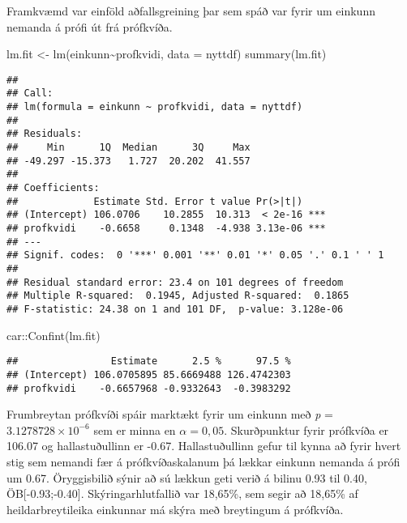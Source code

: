 \documentclass[
]{article}
\newenvironment{Shaded}{\begin{snugshade}}{\end{snugshade}}
\newcommand{\AttributeTok}[1]{\textcolor[rgb]{0.77,0.63,0.00}{#1}}
\newcommand{\FunctionTok}[1]{\textcolor[rgb]{0.00,0.00,0.00}{#1}}
\newcommand{\NormalTok}[1]{#1}
\newcommand{\OtherTok}[1]{\textcolor[rgb]{0.56,0.35,0.01}{#1}}
\newcommand{\SpecialCharTok}[1]{\textcolor[rgb]{0.00,0.00,0.00}{#1}}
\begin{document}
Framkvæmd var einföld aðfallsgreining þar sem spáð var fyrir um einkunn
nemanda á prófi út frá prófkvíða.

\begin{Shaded}
\begin{Highlighting}[]
\NormalTok{lm.fit }\OtherTok{\textless{}{-}} \FunctionTok{lm}\NormalTok{(einkunn}\SpecialCharTok{\textasciitilde{}}\NormalTok{profkvidi, }\AttributeTok{data =}\NormalTok{ nyttdf)}
\FunctionTok{summary}\NormalTok{(lm.fit)}
\end{Highlighting}
\end{Shaded}

\begin{verbatim}
## 
## Call:
## lm(formula = einkunn ~ profkvidi, data = nyttdf)
## 
## Residuals:
##     Min      1Q  Median      3Q     Max 
## -49.297 -15.373   1.727  20.202  41.557 
## 
## Coefficients:
##             Estimate Std. Error t value Pr(>|t|)    
## (Intercept) 106.0706    10.2855  10.313  < 2e-16 ***
## profkvidi    -0.6658     0.1348  -4.938 3.13e-06 ***
## ---
## Signif. codes:  0 '***' 0.001 '**' 0.01 '*' 0.05 '.' 0.1 ' ' 1
## 
## Residual standard error: 23.4 on 101 degrees of freedom
## Multiple R-squared:  0.1945, Adjusted R-squared:  0.1865 
## F-statistic: 24.38 on 1 and 101 DF,  p-value: 3.128e-06
\end{verbatim}

\begin{Shaded}
\begin{Highlighting}[]
\NormalTok{car}\SpecialCharTok{::}\FunctionTok{Confint}\NormalTok{(lm.fit)}
\end{Highlighting}
\end{Shaded}

\begin{verbatim}
##                Estimate      2.5 %      97.5 %
## (Intercept) 106.0705895 85.6669488 126.4742303
## profkvidi    -0.6657968 -0.9332643  -0.3983292
\end{verbatim}

Frumbreytan prófkvíði spáir marktækt fyrir um einkunn með \emph{p} =
\ensuremath{3.1278728\times 10^{-6}} sem er minna en \(\alpha = 0,05\).
Skurðpunktur fyrir prófkvíða er 106.07 og hallastuðullinn er -0.67.
Hallastuðullinn gefur til kynna að fyrir hvert stig sem nemandi fær á
prófkvíðaskalanum þá lækkar einkunn nemanda á prófi um 0.67.
Öryggisbilið sýnir að sú lækkun geti verið á bilinu 0.93 til 0.40,
ÖB{[}-0.93;-0.40{]}. Skýringarhlutfallið var 18,65\%, sem segir að
18,65\% af heildarbreytileika einkunnar má skýra með breytingum á
prófkvíða.
\end{document}
